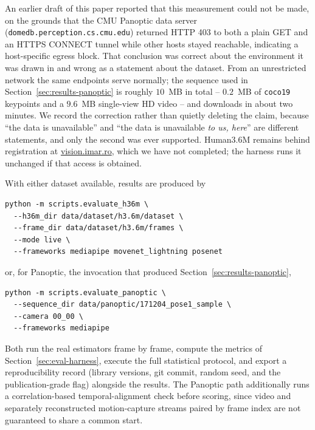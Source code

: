 \documentclass[conference]{IEEEtran}
\begin{document}
An earlier draft of this paper reported that this measurement could not
be made, on the grounds that the CMU Panoptic data server
(\texttt{domedb.perception.cs.cmu.edu}) returned HTTP 403 to both a plain
GET and an HTTPS CONNECT tunnel while other hosts stayed reachable,
indicating a host-specific egress block. That conclusion was correct
about the environment it was drawn in and wrong as a statement about the
dataset. From an unrestricted network the same endpoints serve normally;
the sequence used in Section~\ref{sec:results-panoptic} is roughly
$10$~MB in total -- $0.2$~MB of \texttt{coco19} keypoints and a $9.6$~MB
single-view HD video -- and downloads in about two minutes. We record the
correction rather than quietly deleting the claim, because ``the data is
unavailable'' and ``the data is unavailable \emph{to us, here}'' are
different statements, and only the second was ever supported. Human3.6M
\cite{ionescu2014human36m} remains behind registration at
\url{vision.imar.ro}, which we have not completed; the harness runs it
unchanged if that access is obtained.

With either dataset available, results are produced by
\begin{verbatim}
python -m scripts.evaluate_h36m \
  --h36m_dir data/dataset/h3.6m/dataset \
  --frame_dir data/dataset/h3.6m/frames \
  --mode live \
  --frameworks mediapipe movenet_lightning posenet
\end{verbatim}
or, for Panoptic, the invocation that produced
Section~\ref{sec:results-panoptic},
\begin{verbatim}
python -m scripts.evaluate_panoptic \
  --sequence_dir data/panoptic/171204_pose1_sample \
  --camera 00_00 \
  --frameworks mediapipe
\end{verbatim}
Both run the real estimators frame by frame, compute the metrics of
Section~\ref{sec:eval-harness}, execute the full statistical protocol,
and export a reproducibility record (library versions, git commit, random
seed, and the publication-grade flag) alongside the results. The Panoptic
path additionally runs a correlation-based temporal-alignment check
before scoring, since video and separately reconstructed motion-capture
streams paired by frame index are not guaranteed to share a common start.
\end{document}
